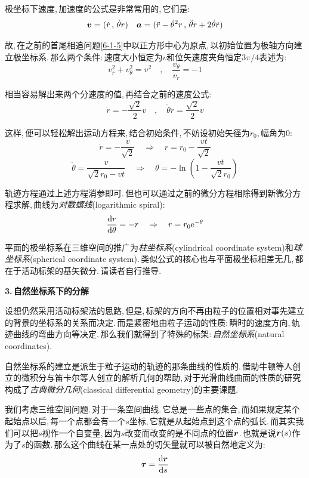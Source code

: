 极坐标下速度,\,加速度的公式是非常常用的,\,它们是:
\[\boldsymbol{v}=(\dot{r}\,,\,\dot{\theta}r)\quad\boldsymbol{a}=(\ddot{r}-\dot{\theta}^2r\,,\,\ddot{\theta}r+2\dot{\theta}\dot{r})\]

故,\,在之前的首尾相追问题\ref{6-1-5}中以正方形中心为原点,\,以初始位置为极轴方向建立极坐标系.\,那么两个条件:\,速度大小恒定为$v$和位矢速度夹角恒定$3\pi/4$表述为:
\[v_r^2+v_\theta^2=v^2\quad ,\quad \frac{v_\theta}{v_r}=-1\]

相当容易解出来两个分速度的值,\,再结合之前的速度公式:
\[\dot{r}=-\frac{\sqrt{2}}{2}v\quad ,\quad \dot{\theta}r=\frac{\sqrt{2}}{2}v\]

这样,\,便可以轻松解出运动方程来,\,结合初始条件,\,不妨设初始矢径为$r_0$,\,幅角为$0$:
\[\dot{r}=-\frac{v}{\sqrt{2}}\quad \Rightarrow \quad r=r_0-\frac{vt}{\sqrt{2}}\]
\[\dot{\theta}=\frac{v}{\sqrt{2}r_0-vt}\quad \Rightarrow \quad  \theta =-\ln\left(1-\frac{vt}{\sqrt{2}r_0}\right)\]

轨迹方程通过上述方程消参即可.\,但也可以通过之前的微分方程相除得到新微分方程求解,\,曲线为\emph{对数螺线}(logarithmic spiral):
\[\frac{\textrm{d} r}{\textrm{d} \theta}=-r\quad \Rightarrow \quad r=r_0{\rm e}^{-\theta}\]

平面的极坐标系在三维空间的推广为\emph{柱坐标系}(cylindrical coordinate system)和\emph{球坐标系}(spherical coordinate system).\,类似公式的核心也与平面极坐标相差无几,\,都在于活动标架的基矢微分.\,请读者自行推导.

\vspace{0.2cm}
{\bf 3.\,自然坐标系下的分解}

设想仍然采用活动标架法的思路,\,但是,\,标架的方向不再由粒子的位置相对事先建立的背景的坐标系的关系而决定.\,而是紧密地由粒子运动的性质:\,瞬时的速度方向,\,轨迹曲线的弯曲方向等决定.\,那么我们就得到了特殊的标架:\,\emph{自然坐标系}(natural coordinates).

自然坐标系的建立是派生于粒子运动的轨迹的那条曲线的性质的.\,借助牛顿等人创立的微积分与笛卡尔等人创立的解析几何的帮助,\,对于光滑曲线曲面的性质的研究构成了\emph{古典微分几何}(classical differential geometry)的主要课题.\,

我们考虑三维空间问题.\,对于一条空间曲线.\,它总是一些点的集合,\,而如果规定某个起始点以后,\,每一个点都会有一个$s$坐标,\,它就是从起始点到这个点的弧长.\,而其实我们可以把$s$视作一个自变量,\,因为$s$改变而改变的是不同点的位置$\boldsymbol{r}$.\,也就是说$\boldsymbol{r}(s)$作为了$s$的函数.\,那么这个曲线在某一点处的切矢量就可以被自然地定义为:
\[\boldsymbol{\tau}=\frac{\textrm{d} \boldsymbol{r}}{\textrm{d} s}\]

